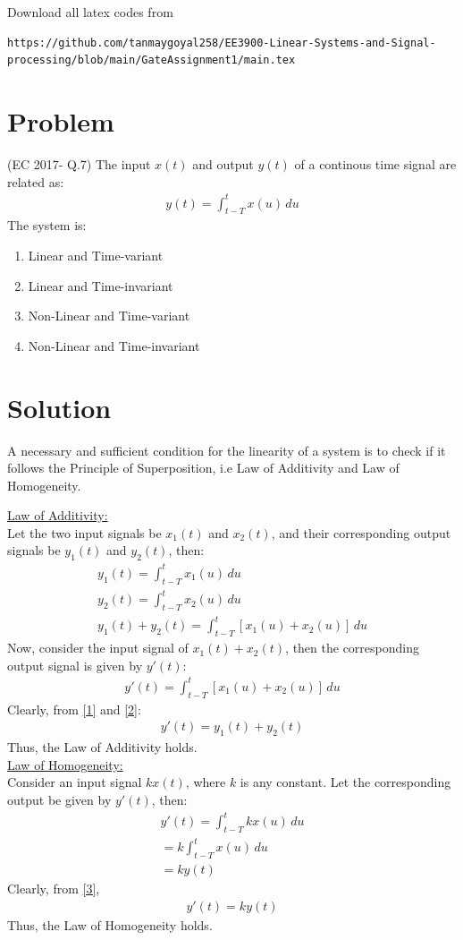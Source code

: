 \documentclass[journal,12pt,twocolumn]{IEEEtran}
\begin{document}
Download all latex codes from 
\begin{lstlisting}
https://github.com/tanmaygoyal258/EE3900-Linear-Systems-and-Signal-processing/blob/main/GateAssignment1/main.tex
\end{lstlisting}
\section{Problem}
(EC 2017- Q.7) The input $x(t)$ and output $y(t)$ of a continous time signal are related as:
\begin{align}
    y(t) = \int_{t-T}^tx(u)\,du
\end{align}
The system is:
\begin{enumerate}
    \item Linear and Time-variant
    \item Linear and Time-invariant
    \item Non-Linear and Time-variant
    \item Non-Linear and Time-invariant
\end{enumerate}
\section{Solution}
A necessary and sufficient condition for the linearity of a system is to check if it follows the Principle of Superposition, i.e Law of Additivity and Law of Homogeneity.

\underline{Law of Additivity:}\\
Let the two input signals be $x_1(t)$ and $x_2(t)$, and their corresponding output signals be $y_1(t)$ and $y_2(t)$, then:
\begin{align}
    y_1(t) = \int_{t-T}^tx_1(u)\,du\\
    y_2(t) = \int_{t-T}^tx_2(u)\,du\\
    y_1(t) + y_2(t) = \int_{t-T}^t[x_1(u) + x_2(u)]\,du
    \label{1}
\end{align}
Now, consider the input signal of $x_1(t) + x_2(t)$, then the corresponding output signal is given by $y'(t)$:
\begin{align}
    y'(t) = \int_{t-T}^t[x_1(u) + x_2(u)]\,du
    \label{2}
\end{align}
Clearly, from \eqref{1} and \eqref{2}:
\begin{align}
    y'(t) = y_1(t) + y_2(t)
\end{align}
Thus, the Law of Additivity holds.\\

\underline{Law of Homogeneity: }\\
Consider an input signal $kx(t)$, where $k$ is any constant. Let the corresponding output be given by $y'(t)$, then:
\begin{align}
    y'(t) = \int_{t-T}^t kx(u)\,du\\
    = k\int_{t-T}^t x(u)\,du\\
     = ky(t)
     \label{3}
\end{align}
Clearly, from \eqref{3},
\begin{align}
    y'(t) = ky(t)
\end{align}
Thus, the Law of Homogeneity holds.\\
\end{document}
